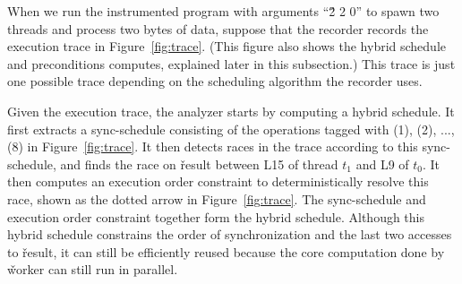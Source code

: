 When we run the instrumented program with arguments ``\v{2 2 0}'' to spawn
two threads and process two bytes of data, suppose that the recorder records
the execution trace in Figure~\ref{fig:trace}.  (This figure also shows
the hybrid schedule and preconditions \peregrine computes, explained
later in this subsection.)  This trace is just one
possible trace depending on the scheduling algorithm the recorder uses.




Given the execution trace, the analyzer starts by computing a hybrid
schedule.  It first extracts a sync-schedule consisting of the operations
tagged with (1), (2), ..., (8) in Figure~\ref{fig:trace}.  It then detects races in
the trace according to this sync-schedule, and finds the race on
\v{result} between L15 of thread $t_1$ and L9 of $t_0$.  It then computes an
execution order constraint to deterministically resolve this race, shown
as the dotted arrow in Figure~\ref{fig:trace}.  The sync-schedule and
execution order constraint together form the hybrid schedule.  Although
this hybrid schedule constrains the order of synchronization and the last
two accesses to \v{result}, it can still be efficiently reused because the
core computation done by \v{worker} can still run in parallel.

